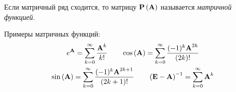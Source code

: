 \documentclass[../../calc-math-exam-2023.tex]{subfiles}
\begin{document}
    \begin{definition}
        Если матричный ряд сходится, то матрицу $\bf{P} \left( \bf{A} \right)$ называется
        \emph{матричной функцией}.
    \end{definition}
    Примеры матричных функций:
    \begin{gather*}
        e^{\bf{A}} = \sum_{k=0}^{\infty} \frac{\bf{A}^k}{k!} \qquad \cos\left( \bf{A} \right) = \sum_{k=0}^{\infty} \frac{(-1)^k \bf{A}^{2k}}{(2k)!} \\
        \sin \left( \bf{A} \right) = \sum_{k=0}^{\infty} \frac{(-1)^k \bf{A}^{2k + 1}}{(2k+1)!} \qquad \left( \bf{E} - \bf{A} \right)^{-1} = \sum_{k=0}^{\infty} \bf{A}^k
    \end{gather*}
\end{document}
